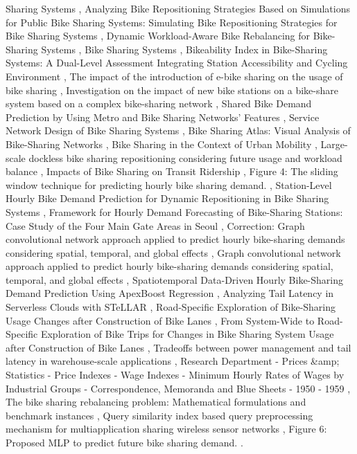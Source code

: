 \documentclass{article}
\begin{document}
Sharing Systems \cite{paper2012bike36b8579c}, Analyzing Bike Repositioning Strategies Based on Simulations for Public Bike Sharing Systems: Simulating Bike Repositioning Strategies for Bike Sharing Systems \cite{wang2013analyzing28f8d1c0}, Dynamic Workload-Aware Bike Rebalancing for Bike-Sharing Systems \cite{luo2023dynamicaa6351a1}, Bike Sharing Systems \cite{brinkmann2020bike3ea4ebc3}, Bikeability Index in Bike-Sharing Systems: A Dual-Level Assessment Integrating Station Accessibility and Cycling Environment \cite{zhang2026bikeabilityb19f06f6}, The impact of the introduction of e-bike sharing on the usage of bike sharing \cite{li2023impactf8551f97}, Investigation on the impact of new bike stations on a bike-share system based on a complex bike-sharing network \cite{kim2023investigation8b61d992}, Shared Bike Demand Prediction by Using Metro and Bike Sharing Networks’ Features \cite{sadeghraimoghaddam2024sharedb393a7a0}, Service Network Design of Bike Sharing Systems \cite{vogel2016serviceedddaae4}, Bike Sharing Atlas: Visual Analysis of Bike-Sharing Networks \cite{oppermann2018bikef56eb840}, Bike Sharing in the Context of Urban Mobility \cite{vogel2016bike2cdc0e3f}, Large-scale dockless bike sharing repositioning considering future usage and workload balance \cite{hua2022largescale9364fc80}, Impacts of Bike Sharing on Transit Ridership \cite{aljerindimpactsa8dde5c8}, Figure 4: The sliding window technique for predicting hourly bike sharing demand. \cite{paperndfigure3ff39c7b}, Station-Level Hourly Bike Demand Prediction for Dynamic Repositioning in Bike Sharing Systems \cite{wu2019stationlevel61be6a10}, Framework for Hourly Demand Forecasting of Bike-Sharing Stations: Case Study of the Four Main Gate Areas in Seoul \cite{hong2022framework379bf9f4}, Correction: Graph convolutional network approach applied to predict hourly bike-sharing demands considering spatial, temporal, and global effects \cite{kim2022correction29b7ba87}, Graph convolutional network approach applied to predict hourly bike-sharing demands considering spatial, temporal, and global effects \cite{kim2019graph2ba8bd0a}, Spatiotemporal Data-Driven Hourly Bike-Sharing Demand Prediction Using ApexBoost Regression \cite{biswas2025spatiotemporal0c159daa}, Analyzing Tail Latency in Serverless Clouds with STeLLAR \cite{ustiugov2021analyzingd7992127}, Road-Specific Exploration of Bike-Sharing Usage Changes after Construction of Bike Lanes \cite{li2022roadspecific9099c795}, From System-Wide to Road-Specific Exploration of Bike Trips for Changes in Bike Sharing System Usage after Construction of Bike Lanes \cite{li2022systemwide85690469}, Tradeoffs between power management and tail latency in warehouse-scale applications \cite{kanev2014tradeoffseb5a8f2e}, Research Department - Prices \&amp; Statistics - Price Indexes - Wage Indexes - Minimum Hourly Rates of Wages by Industrial Groups - Correspondence, Memoranda and Blue Sheets - 1950 - 1959 \cite{paper2022researchccb01f09}, The bike sharing rebalancing problem: Mathematical formulations and benchmark instances \cite{dellamico2014bikecdcdb26f}, Query similarity index based query preprocessing mechanism for multiapplication sharing wireless sensor networks \cite{verma2020queryfe05167e}, Figure 6: Proposed MLP to predict future bike sharing demand. \cite{paperndfigure140a619b}.
\end{document}
